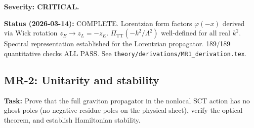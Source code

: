 \documentclass[12pt,a4paper]{article}
\newcommand{\task}[1]{\noindent\textbf{Task:} #1\par}
\begin{document}
\textbf{Severity: CRITICAL.}

\textbf{Status (2026-03-14):} \textcolor{proven}{COMPLETE.}
Lorentzian form factors $\varphi(-x)$ derived via Wick rotation $z_E \to z_L = -z_E$.
$\Pi_{\text{TT}}(-k^2/\Lambda^2)$ well-defined for all real $k^2$.
Spectral representation established for the Lorentzian propagator.
189/189 quantitative checks ALL PASS.
See \texttt{theory/derivations/MR1\_derivation.tex}.

\subsection{MR-2: Unitarity and stability}
\label{task:MR2}

\task{Prove that the full graviton propagator in the nonlocal SCT action
has no ghost poles (no negative-residue poles on the physical sheet),
verify the optical theorem, and establish Hamiltonian stability.}
\end{document}
